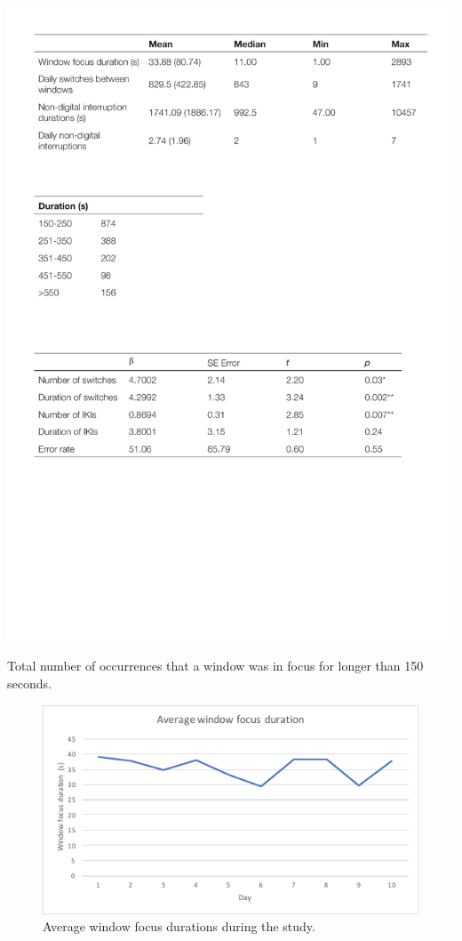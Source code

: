 \begin{table}
\centering
\centerline{\includegraphics[scale=0.8]{images/ch56/ch56_LongWindowDurations.pdf}}
\caption{Total number of occurrences that a window was in focus for longer than 150 seconds.}
\label{tbl:ch56-tblwindowdurations}
\end{table}

\begin{figure}
\centering
\centerline{\includegraphics[scale=1]{images/ch56/ch56_MTDurationSwitches.pdf}}
\caption{Average window focus durations during the study.}
\label{fig:ch56-7_mtdurswitches}
\end{figure}

